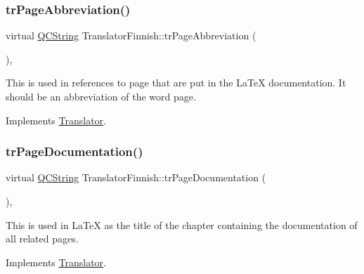 \mbox{\label{class_translator_finnish_a3858c14d692f266daacb46834a024704}} 
\subsubsection{\texorpdfstring{trPageAbbreviation()}{trPageAbbreviation()}}
{\footnotesize\ttfamily virtual \mbox{\hyperlink{class_q_c_string}{Q\+C\+String}} Translator\+Finnish\+::tr\+Page\+Abbreviation (\begin{DoxyParamCaption}{ }\end{DoxyParamCaption})\hspace{0.3cm}{\ttfamily [inline]}, {\ttfamily [virtual]}}

This is used in references to page that are put in the La\+TeX documentation. It should be an abbreviation of the word page. 

Implements \mbox{\hyperlink{class_translator}{Translator}}.

\mbox{\label{class_translator_finnish_ac0c6a21bf97872b3b361f60d2d6bdf05}} 
\subsubsection{\texorpdfstring{trPageDocumentation()}{trPageDocumentation()}}
{\footnotesize\ttfamily virtual \mbox{\hyperlink{class_q_c_string}{Q\+C\+String}} Translator\+Finnish\+::tr\+Page\+Documentation (\begin{DoxyParamCaption}{ }\end{DoxyParamCaption})\hspace{0.3cm}{\ttfamily [inline]}, {\ttfamily [virtual]}}

This is used in La\+TeX as the title of the chapter containing the documentation of all related pages. 

Implements \mbox{\hyperlink{class_translator}{Translator}}.

\mbox{\label{class_translator_finnish_a4f19d0152a27e95d58313f7c20e60ad1}} 
